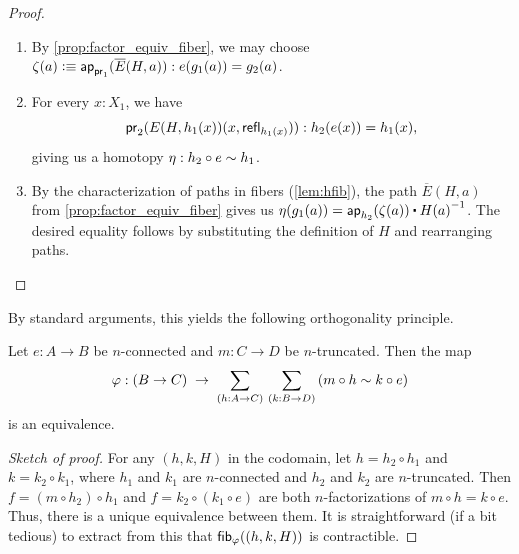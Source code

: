 \begin{proof}
\begin{enumerate}
\item By \cref{prop:factor_equiv_fiber}, we may choose
  $\zeta(a) \vcentcolon\equiv \mathsf{ap}_{\mathsf{pr}_{1}}(\overline E(H,a)) : e(g_1(a)) = g_2(a)$.
  \label{item:orth-fact-2}
\item For every $x:X_1$, we have
\begin{equation*}
\mathsf{pr}_{2}(E(H,h_1(x))({x,\mathsf{refl}_{h_1(x)}})) :h_2(e(x))= h_1(x),
\end{equation*}
giving us a homotopy $\eta:h_2\circ e\sim h_1$.
\item By the characterization of paths in fibers (\cref{lem:hfib}), the path $\overline E(H,a)$ from \cref{prop:factor_equiv_fiber} gives us
  $\eta(g_1(a)) = \apfunc{h_2}(\zeta(a)) \ct \opp{H(a)}$.
  The desired equality follows by substituting the definition of $H$ and rearranging paths.\qedhere
\end{enumerate}
\end{proof}

%

By standard arguments, this yields the following orthogonality principle.

\begin{thm}
  Let $e:A\to B$ be $n$-connected and $m:C\to D$ be $n$-truncated.
  Then the map
  \[ \varphi: (B\to C) \;\to\; \sm{h:A\to C}{k:B\to D} (m\circ h \htpy k \circ e) \]
  is an equivalence.
\end{thm}
\begin{proof}[Sketch of proof]
  For any $(h,k,H)$ in the codomain, let $h = h_2 \circ h_1$ and $k = k_2 \circ k_1$, where $h_1$ and $k_1$ are $n$-connected and $h_2$ and $k_2$ are $n$-truncated.
  Then $f = (m\circ h_2) \circ h_1$ and $f = k_2 \circ (k_1\circ e)$ are both $n$-factorizations of $m \circ h = k\circ e$.
  Thus, there is a unique equivalence between them.
  It is straightforward (if a bit tedious) to extract from this that ${\mathsf{fib}}_{\varphi}((h,k,H))$ is contractible.
\end{proof}

%
%

